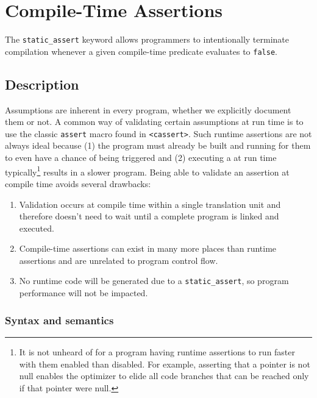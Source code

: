 \newpage
\section[{\tt static\_assert}]{Compile-Time Assertions}\label{compile-time-assertions-(static_assert)}


The \lstinline!static_assert! keyword allows programmers to intentionally terminate compilation whenever a given compile-time predicate
 evaluates to \lstinline!false!.

\subsection[Description]{Description}\label{description}

Assumptions are
inherent in every program, whether we explicitly document them or not. A common way of validating certain
assumptions at run time is to use the classic \lstinline!assert! macro found
in \lstinline!<cassert>!. Such runtime assertions are not always ideal
because (1) the program must already be built and running for them to
even have a chance of being triggered and (2) executing a
 at run time typically{\cprotect\footnote{It is
not unheard of for a program having runtime assertions to run faster with them
enabled than disabled. For example, asserting that a pointer is not
null enables the optimizer to elide all code branches that
  can be reached only if that pointer were null.}} results in a slower
program. Being able to validate an assertion at compile time avoids
several drawbacks:

\begin{enumerate}
\item{Validation occurs at compile time within a single translation unit and therefore doesn’t need to wait until a complete program is linked and executed.}
\item{Compile-time assertions can exist in many more places than runtime assertions and are unrelated to program control flow.}
\item{No runtime code will be generated due to a \lstinline!static_assert!, so program performance will not be impacted.}
\end{enumerate}

\subsubsection[Syntax and semantics]{Syntax and semantics}\label{syntax-and-semantics}

